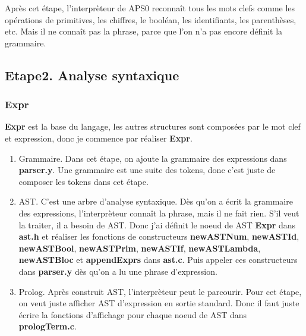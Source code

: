 \documentclass[14px]{article}
\begin{document}
Après cet étape, l'interprèteur de APS0 reconnaît tous les mots clefs comme les opérations de primitives, les chiffres, le booléan, les identifiants, les parenthèses, etc. Mais il ne connaît pas la phrase, parce que l'on n'a pas encore définit la grammaire.


\subsection{Etape2. Analyse syntaxique}
\subsubsection{Expr}
\textbf{Expr} est la base du langage, les autres structures sont composées par le mot clef et expression, donc je commence par réaliser \textbf{Expr}.
\begin{enumerate}
\item Grammaire. Dans cet étape, on ajoute la grammaire des expressions dans \textbf{parser.y}. Une grammaire est une suite des tokens, donc c'est juste de composer les tokens dans cet étape.
\begin{figure}[htbp]
\end{figure}

\item AST. C'est une arbre d'analyse syntaxique. Dès qu'on a écrit la grammaire des expressions, l'interprèteur connaît la phrase, mais il ne fait rien. S'il veut la traiter, il a besoin de AST. Donc j'ai définit le noeud de AST \textbf{Expr} dans \textbf{ast.h} et réaliser les fonctions de constructeurs \textbf{newASTNum}, \textbf{newASTId}, \textbf{newASTBool}, \textbf{newASTPrim}, \textbf{newASTIf}, \textbf{newASTLambda}, \textbf{newASTBloc} et \textbf{appendExprs} dans \textbf{ast.c}. Puis appeler ces constructeurs dans \textbf{parser.y} dès qu'on a lu une phrase d'expression.\\

\item Prolog. Après construit AST, l'interprèteur peut le parcourir. Pour cet étape, on veut juste afficher AST d'expression en sortie standard. Donc il faut juste écrire la fonctions d'affichage pour chaque noeud de AST dans \textbf{prologTerm.c}.
\end{enumerate}
\end{document}
